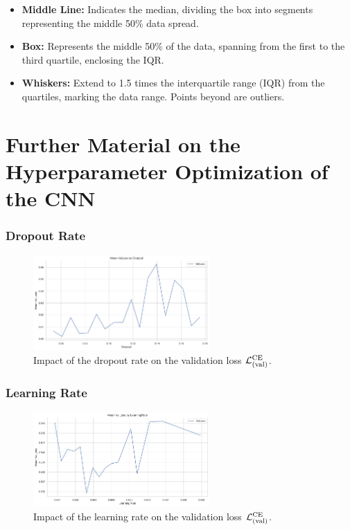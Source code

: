 \begin{itemize}
    \item \textbf{Middle Line:} Indicates the median, dividing the box into segments representing the middle 50\% data spread.
    \item \textbf{Box:} Represents the middle 50\% of the data, spanning from the first to the third quartile, enclosing the IQR.
    \item \textbf{Whiskers:} Extend to 1.5 times the interquartile range (IQR) from the quartiles, marking the data range. Points beyond are outliers.
\end{itemize}

\newpage{}

\section{Further Material on the Hyperparameter Optimization of the CNN}
\label{app:sec:FurtherCNN}

\subsubsection{Dropout Rate}
\begin{figure}[H]
    \centering
    \includegraphics[width=0.6\textwidth]{figures/06_ModelExploration/4_CNN/dropout_274_18bins.png}
    \caption{Impact of the dropout rate on the validation loss \( \mathcal{L}_{(\text{val})}^{\text{CE}} \).}
    \label{fig:dropout_cnn}
\end{figure}

\subsubsection{Learning Rate}

\begin{figure}[H]
    \centering
    \includegraphics[width=0.6\textwidth]{figures/06_ModelExploration/4_CNN/learning_rate.png}
    \caption{Impact of the learning rate on the validation loss \( \mathcal{L}_{(\text{val})}^{\text{CE}} \).}
    \label{fig:lr_cnn}
\end{figure}

